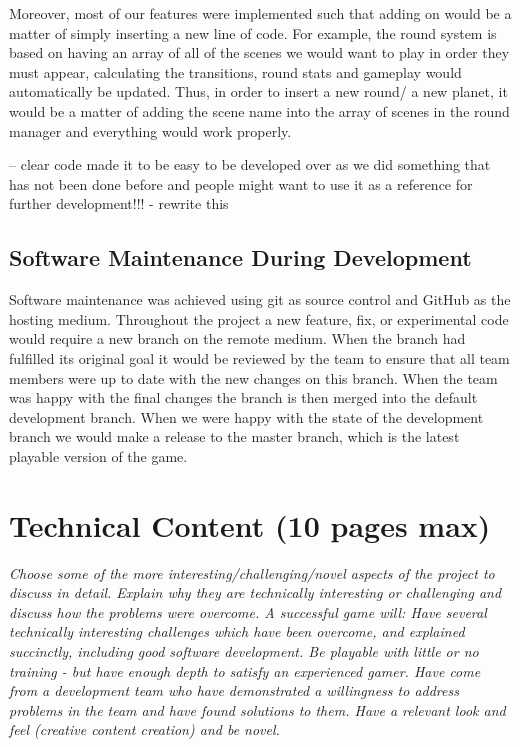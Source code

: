 \documentclass[11pt,a4paper]{article}
\begin{document}
 Moreover, most of our features were implemented such that adding on would be a matter of simply inserting a new line of code. For example, the round system is based on having an array of all of the scenes we would want to play in order they must appear, calculating the transitions, round stats and gameplay would automatically be updated. Thus, in order to insert a new round/ a new planet, it would be a matter of adding the scene name into the array of scenes in the round manager and everything would work properly.

 -- clear code made it to be easy to be developed over as we did something that has not been done before and people might want to use it as a reference for further development!!! - rewrite this

 \subsection{Software Maintenance During Development}
 Software maintenance was achieved using git as source control and GitHub as the hosting medium. Throughout the project a new feature, fix, or experimental code would require a new branch on the remote medium. When the branch had fulfilled its original goal it would be reviewed by the team to ensure that all team members were up to date with the new changes on this branch. When the team was happy with the final changes the branch is then merged into the default development branch. When we were happy with the state of the development branch we would make a release to the master branch, which is the latest playable version of the game.

\pagebreak


 \section{Technical Content (10 pages max)}

 \textit{Choose some of the more interesting/challenging/novel aspects of the project to discuss in detail. Explain why they are technically interesting or challenging and discuss how the problems were overcome. A successful game will:
 Have several technically interesting challenges which have been overcome, and explained succinctly, including good software development.
 Be playable with little or no training - but have enough depth to satisfy an experienced gamer.
 Have come from a development team who have demonstrated a willingness to address problems in the team and have found solutions to them.
 Have a relevant look and feel (creative content creation) and be novel.}
\end{document}
